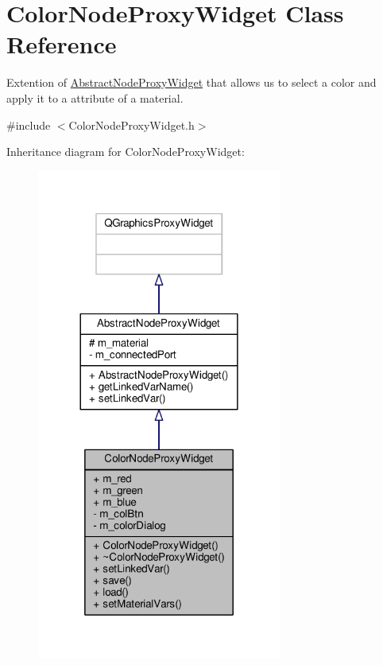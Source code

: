 \hypertarget{class_color_node_proxy_widget}{\section{Color\-Node\-Proxy\-Widget Class Reference}
\label{class_color_node_proxy_widget}
}


Extention of \hyperlink{class_abstract_node_proxy_widget}{Abstract\-Node\-Proxy\-Widget} that allows us to select a color and apply it to a attribute of a material.  




{\ttfamily \#include $<$Color\-Node\-Proxy\-Widget.\-h$>$}



Inheritance diagram for Color\-Node\-Proxy\-Widget\-:
\nopagebreak
\begin{figure}[H]
\begin{center}
\leavevmode
\includegraphics[width=228pt]{class_color_node_proxy_widget__inherit__graph}
\end{center}
\end{figure}


